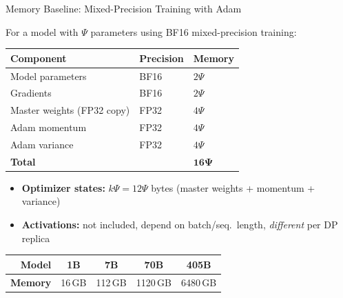 \begin{frame}{Memory Baseline: Mixed-Precision Training with Adam}

  For a model with $\Psi$ parameters using BF16 mixed-precision training:

  \vspace{0.3em}
  \begin{center}
  \begin{tabular}{lll}
    \toprule
    \textbf{Component} & \textbf{Precision} & \textbf{Memory} \\
    \midrule
    Model parameters        & BF16 & $2\Psi$ \\
    Gradients               & BF16 & $2\Psi$ \\
    \midrule
    Master weights (FP32 copy) & FP32 & $4\Psi$ \\
    Adam momentum           & FP32 & $4\Psi$ \\
    Adam variance           & FP32 & $4\Psi$ \\
    \midrule[\heavyrulewidth]
    \textbf{Total}          &      & $\bm{16\Psi}$ \\
    \bottomrule
  \end{tabular}
  \end{center}

  \vspace{0.3em}
  \begin{itemize}\small
    \item \textbf{Optimizer states:} $k\Psi = 12\Psi$ bytes (master weights + momentum + variance)
    \item \textbf{Activations:} not included, depend on batch/seq.\ length, \emph{different} per DP replica
  \end{itemize}

  \vspace{0.3em}
  \begin{center}\small
  \begin{tabular}{rcccc}
    \toprule
    \textbf{Model} & 1B & 7B & 70B & 405B \\
    \midrule
    \textbf{Memory} & 16\,GB & 112\,GB & 1120\,GB & 6480\,GB \\
    \bottomrule
  \end{tabular}
  \end{center}
\end{frame}


